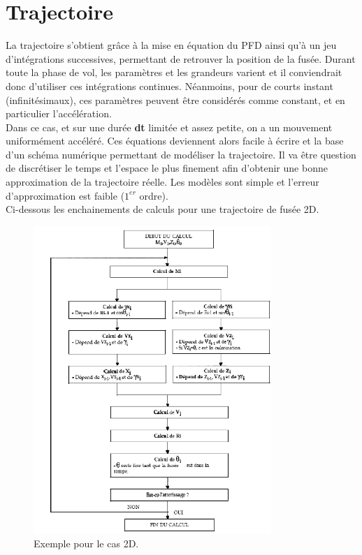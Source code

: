 \documentclass[a4paper]{article}
\begin{document}
\section{Trajectoire}

La trajectoire s'obtient grâce à la mise en équation du PFD ainsi qu'à un jeu d'intégrations successives, permettant de retrouver la position de la fusée. Durant toute la phase de vol, les paramètres et les grandeurs varient et il conviendrait donc d'utiliser ces intégrations continues.
Néanmoins, pour de courts instant (infinitésimaux), ces paramètres peuvent être considérés comme constant, et en particulier l'accélération.\\

Dans ce cas, et sur une durée \textbf{dt} limitée et assez petite, on a un mouvement uniformément accéléré. Ces équations deviennent alors facile à écrire et la base d'un schéma numérique permettant de modéliser la trajectoire. Il va être question de discrétiser le temps et l'espace le plus finement afin d'obtenir une bonne approximation de la trajectoire réelle. Les modèles sont simple et l'erreur d'approximation est faible ($1^{er}$ ordre).\\

Ci-dessous les enchainements de calculs pour une trajectoire de fusée 2D.

\begin{figure}[!htbp]
\begin{center}
\includegraphics[width=9cm]{pictures/schema.PNG} 
\end{center}
\caption{Exemple pour le cas 2D.}
\label{scheme}
\end{figure}
\end{document}
